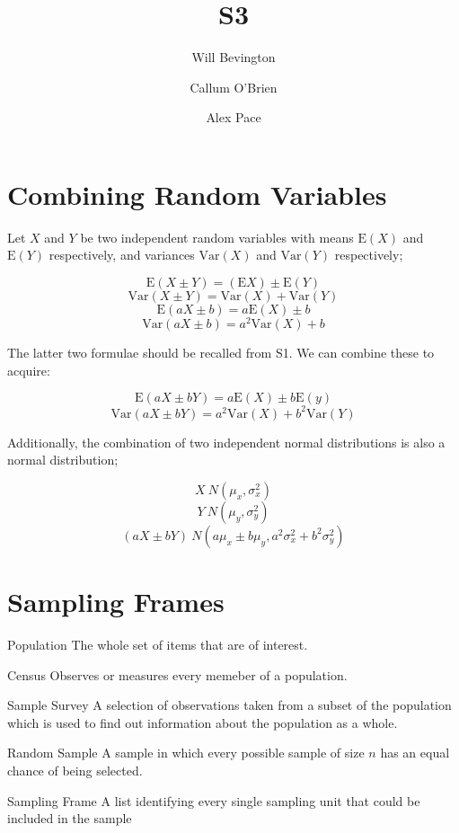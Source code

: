 \documentclass{article}
\begin{document}
\title{S3}
\author{Will Bevington \and Callum O'Brien \and Alex Pace}
\maketitle
\tableofcontents

\newpage

\section{Combining Random Variables}

Let $X$ and $Y$ be two independent random variables with means $\textrm{E}(X)$ and $\textrm{E}(Y)$ respectively, and variances $\textrm{Var}(X)$ and $\textrm{Var}(Y)$ respectively;

\[\textrm{E}(X\pm Y)=(\textrm{E}X)\pm\textrm{E}(Y)\]
\[\textrm{Var}(X\pm Y)=\textrm{Var}(X)+\textrm{Var}(Y)\]
\[\textrm{E}(aX\pm b)=a\textrm{E}(X)\pm b\]
\[\textrm{Var}(aX\pm b)=a^2\textrm{Var}(X)+b\]

\noindent The latter two formulae should be recalled from S1. We can combine these to acquire:

\[\textrm{E}(aX\pm bY) = a\textrm{E}(X)\pm b\textrm{E}(y)\]
\[\textrm{Var}(aX\pm bY) = a^2\textrm{Var}(X)+b^2\textrm{Var}(Y)\]

\noindent Additionally, the combination of two independent normal distributions is also a normal distribution;

\[X~N(\mu_x,\sigma_x^2)\]
\[Y~N(\mu_y,\sigma_y^2)\]
\[(aX\pm bY)~N(a\mu_x\pm b\mu_y,a^2\sigma_x^2+b^2\sigma_y^2)\]

\section{Sampling Frames}

\begin{description}
    
    \item{Population} The whole set of items that are of interest.
    \item{Census} Observes or measures every memeber of a population.
    \item{Sample Survey} A selection of observations taken from a subset of the population which is used to find out information about the population as a whole.
    \item{Random Sample} A sample in which every possible sample of size $n$ has an equal chance of being selected.
    \item{Sampling Frame} A list identifying every single sampling unit that could be included in the sample

\end{description}
\end{document}
